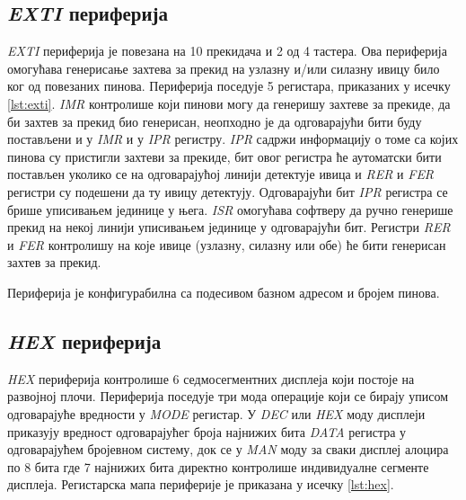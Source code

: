 \subsection{\textit{EXTI} периферија}

\textit{\acrfull{EXTI}} периферија је повезана на 10 прекидача и 2 од 4 тастера. Ова периферија омогућава генерисање захтева за прекид на узлазну и/или силазну ивицу било ког од повезаних пинова. Периферија поседује 5 регистара, приказаних у исечку \ref{lst:exti}. \textit{\acrfull{IMR}} контролише који пинови могу да генеришу захтеве за прекиде, да би захтев за прекид био генерисан, неопходно је да одговарајући бити буду постављени и у \textit{\acrshort{IMR}} и у \textit{\acrshort{IPR}} регистру. \textit{\acrfull{IPR}} садржи информацију о томе са којих пинова су пристигли захтеви за прекиде, бит овог регистра ће аутоматски бити постављен уколико се на одговарајућој линији детектује ивица и \textit{\acrshort{RER}} и \textit{\acrshort{FER}} регистри су подешени да ту ивицу детектују. Одговарајући бит \textit{\acrshort{IPR}} регистра се брише уписивањем јединице у њега. \textit{\acrfull{ISR}} омогућава софтверу да ручно генерише прекид на некој линији уписивањем јединице у одговарајући бит. Регистри  \textit{\acrfull{RER}} и \textit{\acrfull{FER}} контролишу на које ивице (узлазну, силазну или обе) ће бити генерисан захтев за прекид.



Периферија је конфигурабилна са подесивом базном адресом и бројем пинова.

\subsection{\textit{HEX} периферија}

\textit{\textit{HEX}} периферија контролише 6 седмосегментних дисплеја који постоје на развојној плочи.
Периферија поседује три мода операције који се бирају уписом одговарајуће вредности у \textit{MODE} регистар.
У \textit{DEC} или \textit{HEX} моду дисплеји приказују вредност одговарајућег броја најнижих бита \textit{DATA} регистра у одговарајућем бројевном систему, док се у \textit{MAN} моду за сваки дисплеј алоцира по 8 бита где 7 најнижих бита директно контролише индивидуалне сегменте дисплеја. Регистарска мапа периферије је приказана у исечку \ref{lst:hex}.



